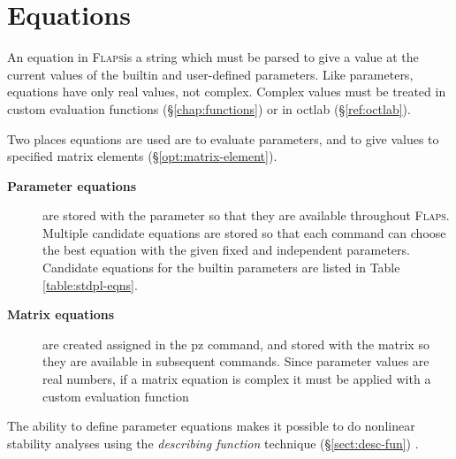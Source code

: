 \documentclass[11pt,openany,twoside]{book}
\numberwithin{equation}{section}		%
\newcommand{\Cmd}[1]{{\sf #1}}
\newcommand{\Newterm}[1]{{\em #1}}
\newcommand{\Flaps}{\textsc{Flaps\:}}
\newcommand{\Sectref}[1]{\S\ref{#1}}
\newcommand{\Tableref}[1]{Table \ref{#1}}
\begin{document}
\chapter{Equations}\label{chap:equations}
An equation in \Flaps is a string which must be parsed to
give a value at the current values of the builtin and user-defined
parameters. Like parameters, equations have only real values, not
complex. Complex values must be treated in custom evaluation functions
(\Sectref{chap:functions}) or in \Cmd{octlab}
(\Sectref{ref:octlab}).

Two places equations are used are to evaluate parameters,
and to give values to specified matrix elements (\Sectref{opt:matrix-element}).

\begin{description}
\item[{\bf Parameter equations}] are stored with the parameter
so that they are available throughout \Flaps. Multiple candidate
equations are stored so that each command can choose the best
equation with the given fixed and independent parameters.
Candidate equations for the builtin parameters are
listed in \Tableref{table:stdpl-eqns}.
\item[{\bf Matrix equations}] are created assigned in the \Cmd{pz} command,
and stored with the matrix so they are available in subsequent commands.
Since parameter values are real numbers, if a matrix equation is
complex it must be applied with a custom evaluation function
\end{description}


The ability to define parameter equations makes it possible
to do nonlinear stability analyses using the \Newterm{describing function}
technique (\Sectref{sect:desc-fun})\cite{krylov1947introduction}
\cite{gelb1968multiple}.
\end{document}
